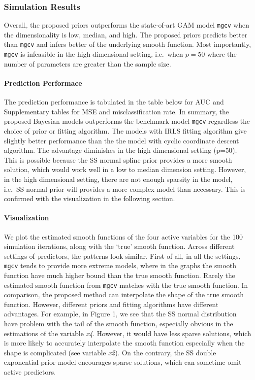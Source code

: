 \documentclass[AMA,STIX1COL,]{WileyNJD-v2}
\begin{document}
\hypertarget{simulation-results}{%
\subsubsection{Simulation Results}\label{simulation-results}}

Overall, the proposed priors outperforms the state-of-art GAM model
\texttt{mgcv} when the dimensionality is low, median, and high. The
proposed priors predicts better than \texttt{mgcv} and infers better of
the underlying smooth function. Most importantly, \texttt{mgcv} is
infeasible in the high dimensional setting, i.e.~when \(p=50\) where the
number of parameters are greater than the sample size.

\hypertarget{prediction-performace}{%
\paragraph{Prediction Performace}\label{prediction-performace}}

The prediction performance is tabulated in the table below for AUC and
Supplementary tables for MSE and misclassification rate. In summary, the
proposed Bayesian models outperforms the benchmark model \texttt{mgcv}
regardless the choice of prior or fitting algorithm. The models with
IRLS fitting algorithm give slightly better performance than the the
model with cyclic coordinate descent algorithm. The advantage diminishes
in the high dimensional setting (p=50). This is possible because the SS
normal spline prior provides a more smooth solution, which would work
well in a low to median dimension setting. However, in the high
dimensional setting, there are not enough sparsity in the model, i.e.~SS
normal prior will provides a more complex model than necessary. This is
confirmed with the visualization in the following section.

\hypertarget{visualization}{%
\paragraph{Visualization}\label{visualization}}

We plot the estimated smooth functions of the four active variables for
the 100 simulation iterations, along with the `true' smooth function.
Across different settings of predictors, the patterns look similar.
First of all, in all the settings, \texttt{mgcv} tends to provide more
extreme models, where in the graphs the smooth function have much higher
bound than the true smooth function. Rarely the estimated smooth
function from \texttt{mgcv} matches with the true smooth function. In
comparison, the proposed method can interpolate the shape of the true
smooth function. However, different priors and fitting algorithms have
different advantages. For example, in Figure 1, we see that the SS
normal distribution have problem with the tail of the smooth function,
especially obvious in the estimations of the variable \emph{x4}.
However, it would have less sparse solutions, which is more likely to
accurately interpolate the smooth function especially when the shape is
complicated (see variable \emph{x2}). On the contrary, the SS double
exponential prior model encourages sparse solutions, which can sometime
omit active predictors.
\end{document}
